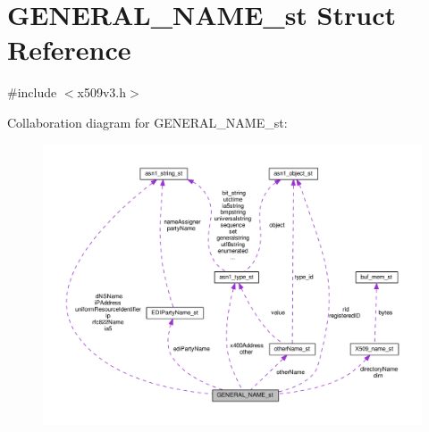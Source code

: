 \hypertarget{struct_g_e_n_e_r_a_l___n_a_m_e__st}{}\section{G\+E\+N\+E\+R\+A\+L\+\_\+\+N\+A\+M\+E\+\_\+st Struct Reference}
\label{struct_g_e_n_e_r_a_l___n_a_m_e__st}


{\ttfamily \#include $<$x509v3.\+h$>$}



Collaboration diagram for G\+E\+N\+E\+R\+A\+L\+\_\+\+N\+A\+M\+E\+\_\+st\+:
\nopagebreak
\begin{figure}[H]
\begin{center}
\leavevmode
\includegraphics[width=350pt]{struct_g_e_n_e_r_a_l___n_a_m_e__st__coll__graph}
\end{center}
\end{figure}
